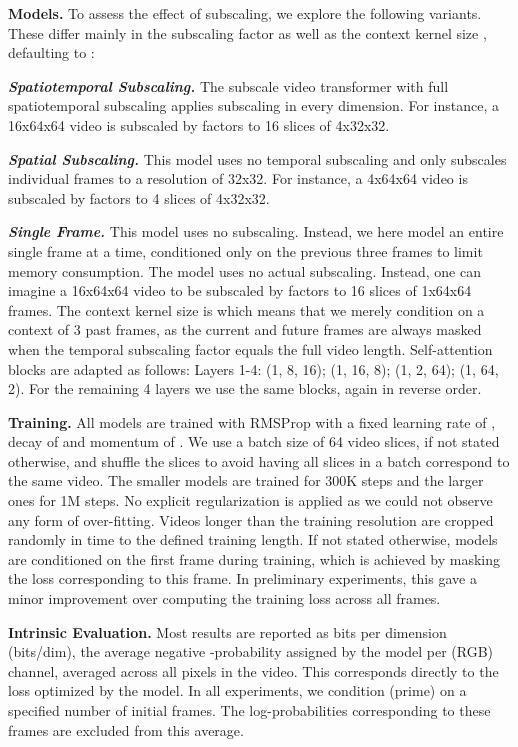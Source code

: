 \documentclass{article} \usepackage{iclr2020_conference,times}
\begin{document}
\textbf{Models.} To assess the effect of subscaling, we explore the following variants. These differ mainly in the subscaling factor  as well as the context kernel size , defaulting to :

\textit{\textbf{Spatiotemporal Subscaling.}}
The subscale video transformer with full spatiotemporal subscaling applies subscaling in every dimension. For instance, a 16x64x64 video is subscaled by factors  to 16 slices of 4x32x32.

\textit{\textbf{Spatial Subscaling.}
}This model uses no temporal subscaling and only subscales individual frames to a resolution of 32x32. For instance, a 4x64x64 video is subscaled by factors  to 4 slices of 4x32x32.

\textit{\textbf{Single Frame.}}
This model uses no subscaling. Instead, we here model an entire single frame at a time, conditioned only on the previous three frames to limit memory consumption. The model uses no actual subscaling. Instead, one can imagine a 16x64x64 video to be subscaled by factors  to 16 slices of 1x64x64 frames. The context kernel size is  which means that we merely condition on a context of 3 past frames, as the current and future frames are always masked when the temporal subscaling factor equals the full video length.
Self-attention blocks are adapted as follows: Layers 1-4: (1, 8, 16); (1, 16, 8); (1, 2, 64); (1, 64, 2). For the remaining 4 layers we use the same blocks, again in reverse order.

\textbf{Training.}
All models are trained with RMSProp \citep{tieleman2012lecture} with a fixed learning rate of , decay of  and momentum of . We use a batch size of 64 video slices, if not stated otherwise, and shuffle the slices to avoid having all slices in a batch correspond to the same video. The smaller models are trained for 300K steps and the larger ones for 1M steps. No explicit regularization is applied as we could not observe any form of over-fitting. Videos longer than the training resolution are cropped randomly in time to the defined training length. If not stated otherwise, models are conditioned on the first frame during training, which is achieved by masking the loss corresponding to this frame. In preliminary experiments, this gave a minor improvement over computing the training loss across all frames.

\textbf{Intrinsic Evaluation.}
Most results are reported as bits per dimension (bits/dim), the average negative -probability assigned by the model per (RGB) channel, averaged across all pixels in the video. This corresponds directly to the loss optimized by the model. In all experiments, we condition (prime) on a specified number of initial frames. The log-probabilities corresponding to these frames are excluded from this average.
\end{document}
